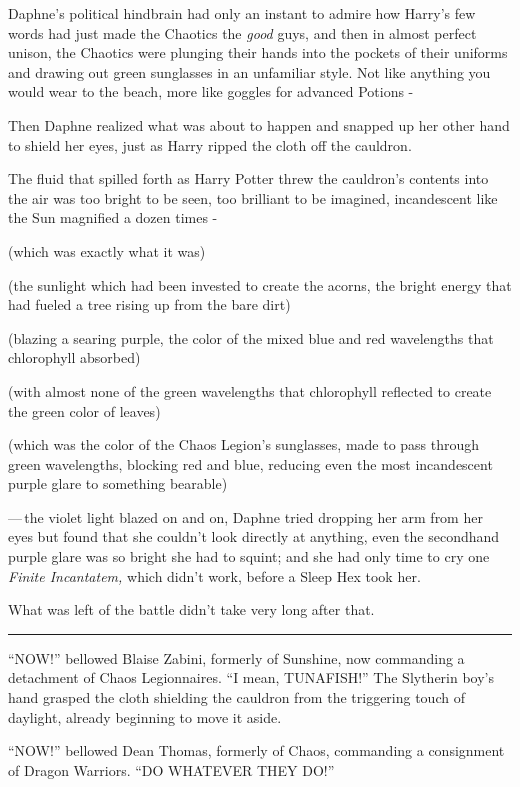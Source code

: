 Daphne's political hindbrain had only an instant to admire how Harry's few words had just made the Chaotics the \emph{good} guys, and then in almost perfect unison, the Chaotics were plunging their hands into the pockets of their uniforms and drawing out green sunglasses in an unfamiliar style. Not like anything you would wear to the beach, more like goggles for advanced Potions -

Then Daphne realized what was about to happen and snapped up her other hand to shield her eyes, just as Harry ripped the cloth off the cauldron.

The fluid that spilled forth as Harry Potter threw the cauldron's contents into the air was too bright to be seen, too brilliant to be imagined, incandescent like the Sun magnified a dozen times -

(which was exactly what it was)

(the sunlight which had been invested to create the acorns, the bright energy that had fueled a tree rising up from the bare dirt)

(blazing a searing purple, the color of the mixed blue and red wavelengths that chlorophyll absorbed)

(with almost none of the green wavelengths that chlorophyll reflected to create the green color of leaves)

(which was the color of the Chaos Legion's sunglasses, made to pass through green wavelengths, blocking red and blue, reducing even the most incandescent purple glare to something bearable)

---\,the violet light blazed on and on, Daphne tried dropping her arm from her eyes but found that she couldn't look directly at anything, even the secondhand purple glare was so bright she had to squint; and she had only time to cry one \emph{Finite Incantatem,} which didn't work, before a Sleep Hex took her.

What was left of the battle didn't take very long after that.

\begin{center}\rule{3in}{0.4pt}\end{center}

``NOW!'' bellowed Blaise Zabini, formerly of Sunshine, now commanding a detachment of Chaos Legionnaires. ``I mean, TUNAFISH!'' The Slytherin boy's hand grasped the cloth shielding the cauldron from the triggering touch of daylight, already beginning to move it aside.

``NOW!'' bellowed Dean Thomas, formerly of Chaos, commanding a consignment of Dragon Warriors. ``DO WHATEVER THEY DO!''

